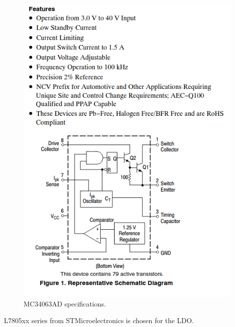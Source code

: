 \documentclass[main.tex]{subfiles}
\begin{document}
    \begin{figure}[!h]
        \centerline{\includegraphics[scale=0.5]{media/MC34063AD_specs.png}}
        \caption{MC34063AD specifications.}
        \label{fig:MC34063AD_specs}
    \end{figure}

    \justify
    L7805xx series from STMicroelectronics \cite{L78} is chosen for the LDO.




    
    
\end{document}
